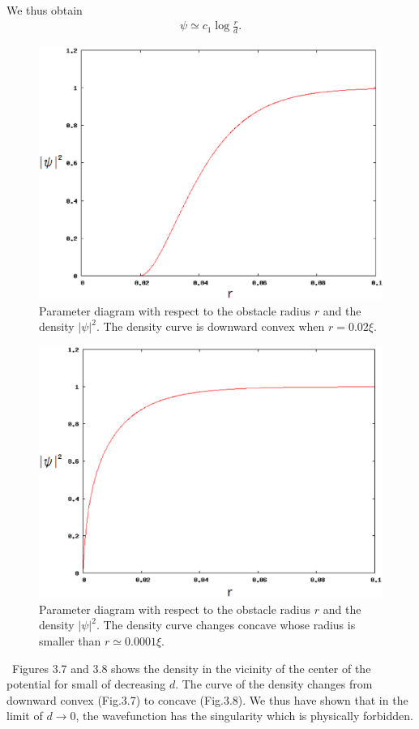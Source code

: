 \documentclass[12pt,a4paper]{report} %
\begin{document}
We thus obtain
\begin{eqnarray}
\psi \simeq c_1 \log \frac{r}{d}.
\end{eqnarray}
\begin{figure}[htbp]\begin{center}
\includegraphics[scale=0.45,keepaspectratio]{3-7.eps}
\caption{
Parameter diagram with respect to the obstacle radius $r$ and the density $|\psi|^2$.
The density curve is downward convex when $r = 0.02 \xi$.
}
\label{FIG:3-7}
\end{center}\end{figure}
\begin{figure}[htbp]\begin{center}
\includegraphics[scale=0.45,keepaspectratio]{3-8.eps}
\caption{
Parameter diagram with respect to the obstacle radius $r$ and the density $|\psi|^2$.
The density curve changes concave whose radius is smaller than $r \simeq 0.0001 \xi$.
}
\label{FIG:3-8}
\end{center}\end{figure}
\ Figures 3.7 and 3.8 shows the density in the vicinity of the center of the potential
for small of decreasing $d$. The curve of the density changes from downward convex (Fig.3.7) to concave (Fig.3.8).
We thus have shown that in the limit of $d \rightarrow 0$,
the wavefunction has the singularity which is physically forbidden.
\newpage
\end{document}
